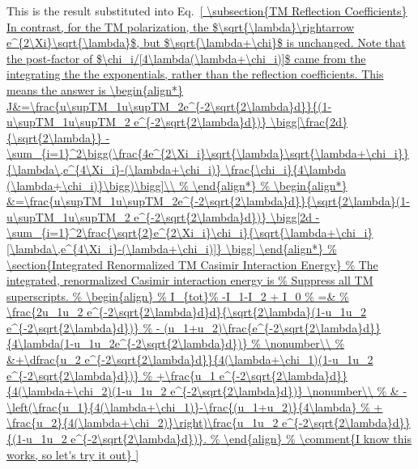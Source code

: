 This is the result substituted into Eq.~\ref{


\subsection{TM Reflection Coefficients}
In contrast, for the TM polarization, the $\sqrt{\lambda}\rightarrow e^{2\Xi}\sqrt{\lambda}$, but $\sqrt{\lambda+\chi}$ is unchanged.
Note that the post-factor of $\chi_i/[4\lambda(\lambda+\chi_i)]$ came from the integrating the  
the exponentials, rather than the reflection coefficients.
This means the answer is
\begin{align*}
  J&=\frac{u\supTM_1u\supTM_2e^{-2\sqrt{2\lambda}d}}{(1-u\supTM_1u\supTM_2 e^{-2\sqrt{2\lambda}d})}
  \bigg[\frac{2d}{\sqrt{2\lambda}}
  -\sum_{i=1}^2\bigg(\frac{4e^{2\Xi_i}\sqrt{\lambda}\sqrt{\lambda+\chi_i}}{\lambda\,e^{4\Xi_i}-(\lambda+\chi_i)}
  \frac{\chi_i}{4\lambda (\lambda+\chi_i)}\bigg)\bigg]\\
  &=\frac{u\supTM_1u\supTM_2e^{-2\sqrt{2\lambda}d}}{\sqrt{2\lambda}(1-u\supTM_1u\supTM_2 e^{-2\sqrt{2\lambda}d})}
  \bigg[2d
  -\sum_{i=1}^2\frac{\sqrt{2}e^{2\Xi_i}\chi_i}{\sqrt{\lambda+\chi_i}[\lambda\,e^{4\Xi_i}-(\lambda+\chi_i)]}
 \bigg]
\end{align*}





}
